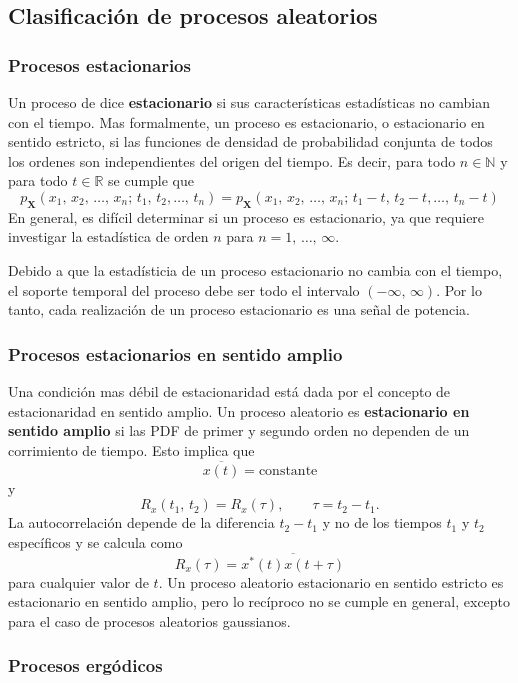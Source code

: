 \documentclass[a4paper]{article}
\begin{document}
\subsection{Clasificación de procesos aleatorios}

\subsubsection{Procesos estacionarios}

Un proceso de dice \textbf{estacionario} si sus características estadísticas no cambian con el tiempo. Mas formalmente, un proceso es estacionario, o estacionario en sentido estricto, si las funciones de densidad de probabilidad conjunta de todos los ordenes son independientes del origen del tiempo. Es decir, para todo \(n\in\mathbb{N}\) y para todo \(t\in\mathbb{R}\) se cumple que
\[
 p_\mathbf{X}(x_1,\,x_2,\,\dots,\,x_n;\,t_1,\,t_2,\dots,\,t_n) =  p_\mathbf{X}(x_1,\,x_2,\,\dots,\,x_n;\,t_1-t,\,t_2-t,\dots,\,t_n-t)
\]
En general, es difícil determinar si un proceso es estacionario, ya que requiere investigar la estadística de orden \(n\) para \(n=1,\,\dots,\,\infty\).

Debido a que la estadísticia de un proceso estacionario no cambia con el tiempo, el soporte temporal del proceso debe ser todo el intervalo \((-\infty,\,\infty)\). Por lo tanto, cada realización de un proceso estacionario es una señal de potencia.

\subsubsection{Procesos estacionarios en sentido amplio}

Una condición mas débil de estacionaridad está dada por el concepto de estacionaridad en sentido amplio. Un proceso aleatorio es \textbf{estacionario en sentido amplio} si las PDF de primer y segundo orden no dependen de un corrimiento de tiempo. Esto implica que
\[
 \overline{x(t)}=\textrm{constante} 
\]
y
\[
 R_x(t_1,\,t_2) = R_x(\tau),\qquad\tau=t_2-t_1.
\]
La autocorrelación depende de la diferencia \(t_2-t_1\) y no de los tiempos \(t_1\) y \(t_2\) específicos y se calcula como
\[
 R_x(\tau) = \overline{x^*(t)x(t+\tau)}
\]
para cualquier valor de \(t\).
Un proceso aleatorio estacionario en sentido estricto es estacionario en sentido amplio, pero lo recíproco no se cumple en general, excepto para el caso de procesos aleatorios gaussianos.

\subsubsection{Procesos ergódicos}
\end{document}
